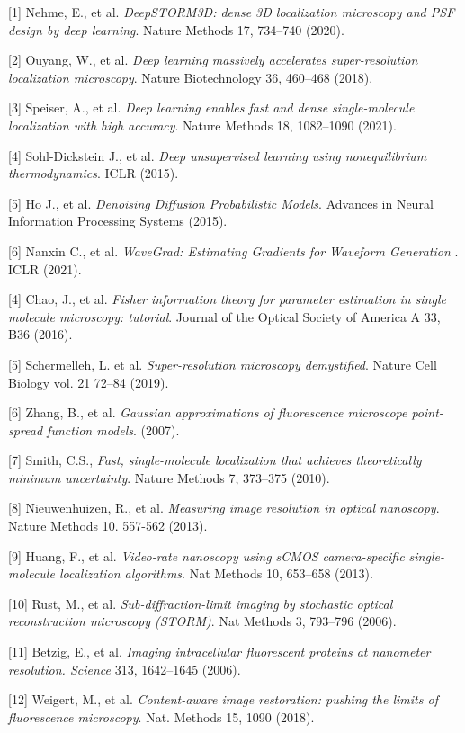 \documentclass{article}
\begin{document}
{
\small


[1] Nehme, E., et al. {\it DeepSTORM3D: dense 3D localization microscopy and PSF design by deep learning}. Nature Methods 17, 734–740 (2020).


[2] Ouyang, W., et al. {\it Deep learning massively accelerates super-resolution localization microscopy}. Nature Biotechnology 36, 460–468 (2018).


[3] Speiser, A., et al. {\it Deep learning enables fast and dense single-molecule localization with high accuracy}. Nature Methods 18, 1082–1090 (2021).

[4] Sohl-Dickstein J., et al. {\it Deep unsupervised learning using nonequilibrium thermodynamics}. ICLR (2015).

[5] Ho J., et al. {\it Denoising Diffusion Probabilistic Models}. Advances in Neural Information Processing Systems (2015).

[6] Nanxin C., et al. {\it WaveGrad: Estimating Gradients for Waveform Generation
}. ICLR (2021).

[4] Chao, J., et al. {\it Fisher information theory for parameter estimation in single molecule microscopy: tutorial}. Journal of the Optical Society of America A 33, B36 (2016). 

[5] Schermelleh, L. et al. {\it Super-resolution microscopy demystified}. Nature Cell Biology vol. 21 72–84 (2019). 

[6] Zhang, B., et al. {\it Gaussian approximations of fluorescence microscope point-spread function models}. (2007). 

[7] Smith, C.S.,  {\it Fast, single-molecule localization that achieves theoretically minimum uncertainty}. Nature Methods 7, 373–375 (2010). 

[8] Nieuwenhuizen, R., et al. {\it Measuring image resolution in optical nanoscopy}. Nature Methods 10. 557-562 (2013). 

[9] Huang, F., et al. {\it Video-rate nanoscopy using sCMOS camera-specific single-molecule localization algorithms}. Nat Methods 10, 653–658 (2013). 

[10] Rust, M., et al. {\it Sub-diffraction-limit imaging by stochastic optical reconstruction microscopy (STORM)}. Nat Methods 3, 793–796 (2006).

[11] Betzig, E., et al. {\it Imaging intracellular fluorescent proteins at nanometer resolution. Science} 313, 1642–1645 (2006).

[12] Weigert, M., et al. {\it Content-aware image restoration: pushing the limits of fluorescence microscopy}. Nat. Methods 15, 1090 (2018).

}
\end{document}
